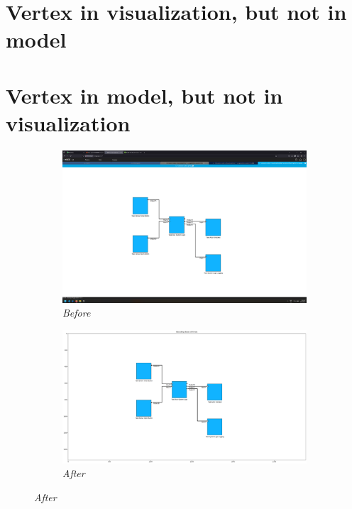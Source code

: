 \documentclass{article}
\begin{document}
\section{Vertex in visualization, but not in model}

\newpage

\section{Vertex in model, but not in visualization}
\begin{figure}[H]
    \centering
    \begin{subfigure}[t]{0.9\textwidth}
        \centering
        \includegraphics[width=\textwidth]{testcases/vertex_in_model_not_in_visualization/142027-594237_input_image.png}
        \caption*{\textit{Before}}
    \end{subfigure}
    \newline
    \begin{subfigure}[t]{0.9\textwidth}
        \centering
        \includegraphics[width=\textwidth]{testcases/vertex_in_model_not_in_visualization/142047-652879_element_bbox_errors_labeled_colored.png}
        \caption*{\textit{After}}
    \end{subfigure}
    \label{fig:vertex_in_model_not_viz}
\end{figure}
\newpage
\end{document}
